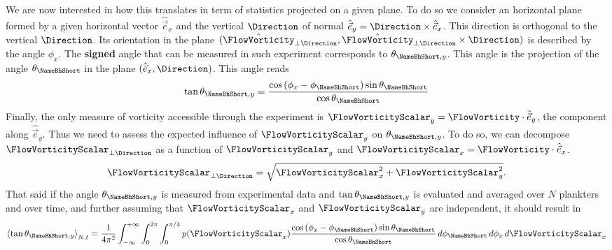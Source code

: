 We are now interested in how this translates in term of statistics projected on a given plane.
To do so we consider an horizontal plane formed by a given horizontal vector $\hat{\vec{e}}_x$ and the vertical $\Direction$ of normal $\hat{\vec{e}}_{y} = \Direction \times \hat{\vec{e}}_{x}$.
This direction is orthogonal to the vertical $\Direction$.
Its orientation in the plane $(\hat{\FlowVorticity}_{\perp \Direction}, \hat{\FlowVorticity}_{\perp \Direction} \times \Direction)$ is described by the angle $\phi_{x}$.
The \textbf{signed} angle that can be measured in such experiment corresponds to $\theta_{\mathrm{\NameBhShort}, y}$.
This angle is the projection of the angle $\theta_{\mathrm{\NameBhShort}}$ in the plane $(\hat{\vec{e}}_x, \Direction)$.
This angle reads
\begin{equation}\label{app:eq:spherical_bottom_heavy_orientation}
	\tan \theta_{\mathrm{\NameBhShort}, y} = \frac{\cos \left( \phi_{x} - \phi_{\mathrm{\NameBhShort}} \right) \sin \theta_{\mathrm{\NameBhShort}}}{\cos \theta_{\mathrm{\NameBhShort}}}
\end{equation}
Finally, the only measure of vorticity accessible through the experiment is $\FlowVorticityScalar_{y} = \FlowVorticity \cdot \hat{\vec{e}}_{y}$, the component along $\hat{\vec{e}}_{y}$.
Thus we need to assess the expected influence of $\FlowVorticityScalar_{y}$ on $\theta_{\mathrm{\NameBhShort}, y}$.
To do so, we can decompose $\FlowVorticityScalar_{\perp \Direction}$ as a function of $\FlowVorticityScalar_{y}$ and $\FlowVorticityScalar_{x} = \FlowVorticity \cdot \hat{\vec{e}}_{x}$.
\begin{equation}\label{app:eq:horizontal_vorticity_expression}
	\FlowVorticityScalar_{\perp \Direction} = \sqrt{\FlowVorticityScalar_{x}^2 + \FlowVorticityScalar_{y}^2}.
\end{equation}
That said if the angle $\theta_{\mathrm{\NameBhShort}, y}$ is measured from experimental data and $\tan \theta_{\mathrm{\NameBhShort}, y}$ is evaluated and averaged over $N$ plankters and over time, and further assuming that $\FlowVorticityScalar_{x}$ and $\FlowVorticityScalar_{y}$ are independent, it should result in
\begin{equation}\label{app:eq:final_correlation_vort_bh}
	\left\langle \tan \theta_{\mathrm{\NameBhShort}, y} \right\rangle_{N, t} = \frac{1}{4 \pi^2} \int_{-\infty}^{+\infty} \int_0^{2\pi} \int_0^{\pi/4} p(\FlowVorticityScalar_x) \frac{\cos \left( \phi_{x} - \phi_{\mathrm{\NameBhShort}} \right) \sin \theta_{\mathrm{\NameBhShort}}}{\cos \theta_{\mathrm{\NameBhShort}}} \, d \phi_{\mathrm{\NameBhShort}} \, d\phi_{x} \, d\FlowVorticityScalar_x
\end{equation}
